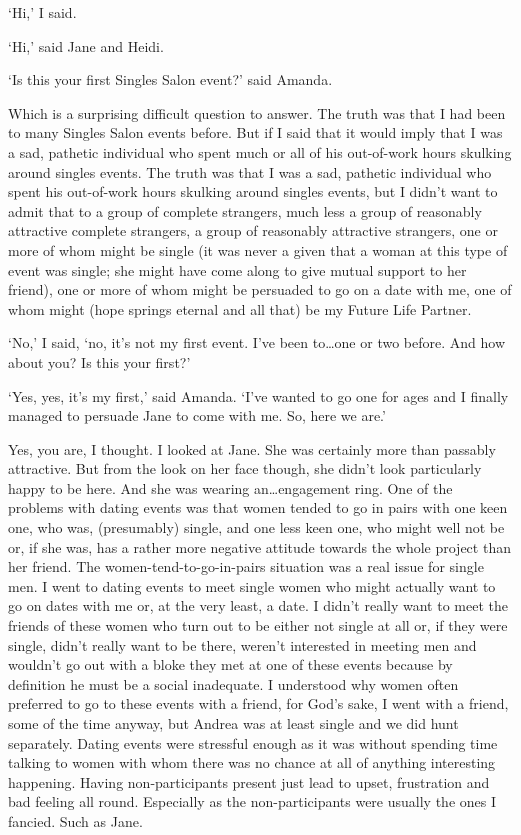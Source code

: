 `Hi,' I said.

`Hi,' said Jane and Heidi.

`Is this your first Singles Salon event?' said Amanda.

Which is a surprising difficult question to answer. The truth was
that I had been to many Singles Salon events before. But if I said
that it would imply that I was a sad, pathetic individual who spent
much or all of his out-of-work hours skulking around singles events.
The truth was that I {\twelveit was\/} a sad, pathetic individual
who spent his out-of-work hours skulking around singles events, but
I didn't want to admit that to a group of complete strangers, much
less a group of reasonably attractive complete strangers, a group of
reasonably attractive strangers, one or more of whom might be single
(it was never a given that a woman at this type of event was single;
she might have come along to give mutual support to her friend), one
or more of whom might be persuaded to go on a date with me, one of
whom might (hope springs eternal and all that) be my Future Life
Partner.

`No,' I said, `no, it's not my first event. I've been to\dots one or
two before. And how about you? Is this your first?'

`Yes, yes, it's my first,' said Amanda. `I've wanted to go one for
ages and I finally managed to persuade Jane to come with me. So,
here we are.'

Yes, you are, I thought. I looked at Jane. She was certainly more
than passably attractive. But from the look on her face though, she
didn't look particularly happy to be here. And she was wearing
an\dots engagement ring. One of the problems with dating events was
that women tended to go in pairs with one keen one, who was,
(presumably) single, and one less keen one, who might well not be
or, if she was, has a rather more negative attitude towards the
whole project than her friend. The women-tend-to-go-in-pairs
situation was a real issue for single men. I went to dating events
to meet single women who might actually want to go on dates with me
or, at the very least, {\twelveit a\/} date. I didn't really want to
meet the friends of these women who turn out to be either not single
at all or, if they were single, didn't really want to be there,
weren't interested in meeting men and wouldn't go out with a bloke
they met at one of these events because by definition he must be a
social inadequate. I understood why women often preferred to go to
these events with a friend, for God's sake, {\twelveit I\/} went
with a friend, some of the time anyway, but Andrea was at least
single and we did hunt separately. Dating events were stressful
enough as it was without spending time talking to women with whom
there was no chance {\twelveit at all\/} of anything interesting
happening. Having non-participants present just lead to upset,
frustration and bad feeling all round. Especially as the
non-participants were usually the ones I fancied. Such as Jane.

